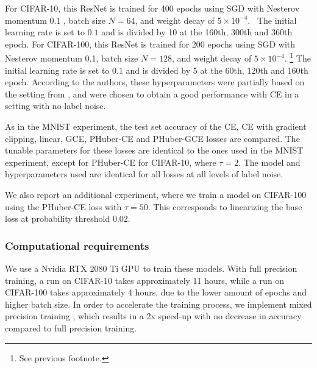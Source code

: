 For CIFAR-10, this ResNet is trained for 400 epochs using SGD with Nesterov momentum 0.1 \parencite{nesterov_method_1983, sutskever_importance_2013}, batch size $N=64$, and weight decay of $5 \times 10^{-4}$. \footnotemark \ The initial learning rate is set to $0.1$ and is divided by 10 at the 160th, 300th and 360th epoch. For CIFAR-100, this ResNet is trained for 200 epochs using SGD with Nesterov momentum 0.1, batch size $N=128$, and weight decay of $5 \times 10^{-4}$. \footnote{See previous footnote.} The initial learning rate is set to $0.1$ and is divided by 5 at the 60th, 120th and 160th epoch. According to the authors, these hyperparameters were partially based on the setting from \textcite{devries_improved_2017}, and were chosen to obtain a good performance with CE in a setting with no label noise.

As in the MNIST experiment, the test set accuracy of the CE, CE with gradient clipping, linear, GCE, PHuber-CE and PHuber-GCE losses are compared. The tunable parameters for these losses are identical to the ones used in the MNIST experiment, except for PHuber-CE for CIFAR-10, where $\tau = 2$. The model and hyperparameters used are identical for all losses at all levels of label noise.

We also report an additional experiment, where we train a model on CIFAR-100 using the PHuber-CE loss with $\tau = 50$. This corresponds to linearizing the base loss at probability threshold $0.02$.


\subsubsection{Computational requirements}
\label{cifar-compute-reqs}
We use a Nvidia RTX 2080 Ti GPU to train these models. With full precision training, a run on CIFAR-10 takes approximately 11 hours, while a run on CIFAR-100 takes approximately 4 hours, due to the lower amount of epochs and higher batch size. In order to accelerate the training process, we implement mixed precision training \parencite{micikevicius_mixed_2017}, which results in a 2x speed-up with no decrease in accuracy compared to full precision training.

